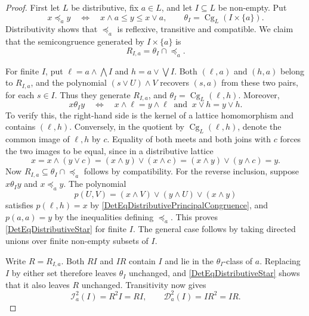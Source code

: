 \documentclass[10pt,a4paper]{amsart}
\begin{document}
\begin{proof}
First let $L$ be distributive, fix $a\in L$, and let $I\subseteq L$
be non-empty. Put
\[
x\preceq_a y\quad\Longleftrightarrow\quad
x\wedge a\leqslant y\leqslant x\vee a,
\qquad
\theta_I=\operatorname{Cg}_L(I\times\{a\}).
\]
Distributivity shows that $\preceq_a$ is reflexive, transitive and
compatible. We claim that the semicongruence generated by
$I\times\{a\}$ is
\begin{equation}\label{DetEqDistributiveStar}
R_{I,a}=\theta_I\cap\preceq_a.
\end{equation}

For finite $I$, put $\ell=a\wedge\bigwedge I$ and
$h=a\vee\bigvee I$. Both $(\ell,a)$ and $(h,a)$ belong to $R_{I,a}$,
and the polynomial $(s\vee U)\wedge V$ recovers $(s,a)$ from these two
pairs, for each $s\in I$. Thus they generate $R_{I,a}$, and
$\theta_I=\operatorname{Cg}_L(\ell,h)$. Moreover,
\begin{equation}\label{DetEqDistributivePrincipalCongruence}
x\mathrel{\theta_I}y
\quad\Longleftrightarrow\quad
x\wedge\ell=y\wedge\ell\ \text{ and }\ x\vee h=y\vee h.
\end{equation}
To verify this, the right-hand side is the kernel of a lattice
homomorphism and contains $(\ell,h)$. Conversely, in the quotient by
$\operatorname{Cg}_L(\ell,h)$, denote the common image of $\ell,h$ by
$c$. Equality of both meets and both joins with $c$ forces the two
images to be equal, since in a distributive lattice
\[
x=x\wedge(y\vee c)
=(x\wedge y)\vee(x\wedge c)
=(x\wedge y)\vee(y\wedge c)=y.
\]
Now $R_{I,a}\subseteq\theta_I\cap\preceq_a$ follows by compatibility.
For the reverse inclusion, suppose $x\mathrel{\theta_I}y$ and
$x\preceq_a y$. The polynomial
\[
p(U,V)=(x\wedge V)\vee(y\wedge U)\vee(x\wedge y)
\]
satisfies $p(\ell,h)=x$ by
\eqref{DetEqDistributivePrincipalCongruence}, and $p(a,a)=y$ by the
inequalities defining $\preceq_a$. This proves
\eqref{DetEqDistributiveStar} for finite $I$. The general case follows
by taking directed unions over finite non-empty subsets of $I$.

Write $R=R_{I,a}$. Both $RI$ and $IR$ contain $I$ and lie in the
$\theta_I$-class of $a$. Replacing $I$ by either set therefore leaves
$\theta_I$ unchanged, and \eqref{DetEqDistributiveStar} shows that it
also leaves $R$ unchanged. Transitivity now gives
\[
\mathcal I_a^2(I)=R^2I=RI,
\qquad
\mathcal D_a^2(I)=IR^2=IR.
\]


\end{proof}
\end{document}

